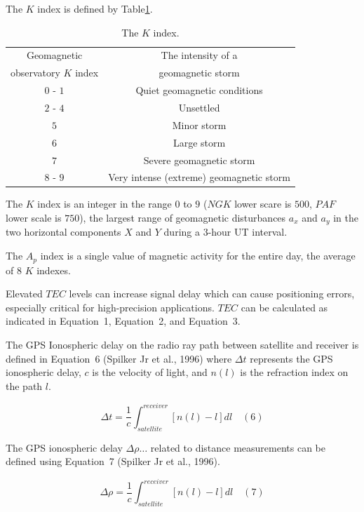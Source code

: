 \documentclass[sn-mathphys-num]{sn-jnl}%
\begin{document}
The $K$ index is defined by Table\ref{tab:K}.

\begin{table}[!ht]
    \centering
    \caption{The $K$ index.}
    \label{tab:K}
    \begin{tabular}{|c|c|}
        \hline
        Geomagnetic & The intensity of a \\ 
        observatory $K$ index & geomagnetic storm \\ \hline
        $0$ - $1$ & Quiet geomagnetic conditions \\ \hline
        $2$ - $4$ & Unsettled \\ \hline
        $5$ & Minor storm \\ \hline
        $6$ & Large storm \\ \hline
        $7$ & Severe geomagnetic storm \\ \hline
        $8$ - $9$ & Very intense (extreme) geomagnetic storm \\ \hline
    \end{tabular}
\end{table}

The $K$ index is an integer in the range $0$ to $9$ ($NGK$ lower scare is $500$, $PAF$ lower scale is $750$), the largest range of geomagnetic disturbances $a_x$ and $a_y$ in the two horizontal components $X$ and $Y$ during a $3$-hour UT interval.

The $A_p$ index is a single value of magnetic activity for the entire day, the average of $8$ $K$ indexes. 
 
Elevated $TEC$ levels can increase signal delay which can cause positioning errors, especially critical for high-precision applications. $TEC$ can be calculated as indicated in Equation~1, Equation~2, and Equation~3. 

The GPS Ionospheric delay on the radio ray path between satellite and receiver is defined in Equation~6 (Spilker Jr et al., 1996) where $\Delta t$ represents the GPS ionospheric delay, $c$ is the velocity of light, and $n(l)$ is the refraction index on the path $l$.

\begin{equation}
	\Delta t = \frac{1}{c} \int_{satellite}^{receiver} \left[ n(l) - l \right]dl
	\quad\left(6\right)
\end{equation}

The GPS ionospheric delay $\Delta \rho \dots$ related to distance measurements can be defined using Equation~7 (Spilker Jr et al., 1996).

\begin{equation}
	\Delta \rho = \frac{1}{c} \int_{satellite}^{receiver} \left[ n(l) - l \right]dl
	\quad\left(7\right)
\end{equation}
\end{document}

